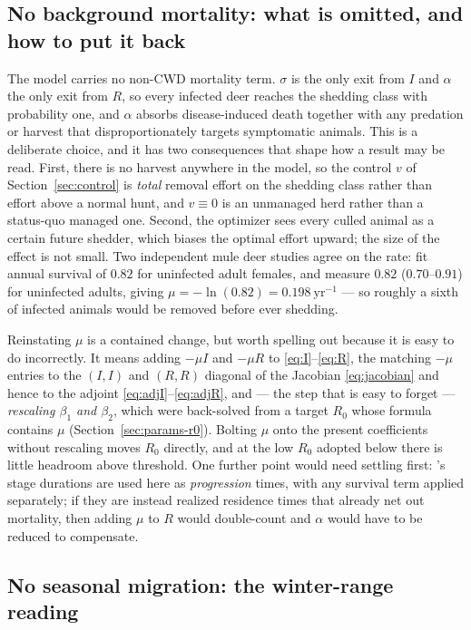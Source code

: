 \documentclass[11pt]{article}
\begin{document}
\subsection{No background mortality: what is omitted, and how to put it back}
\label{sec:params-mortality}

The model carries no non-CWD mortality term. $\sigma$ is the only exit from $I$ and $\alpha$ the only exit from $R$, so every infected deer reaches the shedding class with probability one, and $\alpha$ absorbs disease-induced death together with any predation or harvest that disproportionately targets symptomatic animals. This is a deliberate choice, and it has two consequences that shape how a result may be read. First, there is no harvest anywhere in the model, so the control $v$ of Section~\ref{sec:control} is \emph{total} removal effort on the shedding class rather than effort above a normal hunt, and $v\equiv0$ is an unmanaged herd rather than a status-quo managed one. Second, the optimizer sees every culled animal as a certain future shedder, which biases the optimal effort upward; the size of the effect is not small. Two independent mule deer studies agree on the rate: \citet{Geremia2015} fit annual survival of $0.82$ for uninfected adult females, and \citet{Miller2008} measure $0.82$ ($0.70$--$0.91$) for uninfected adults, giving $\mu = -\ln(0.82) = 0.198\ \mathrm{yr}^{-1}$ --- so roughly a sixth of infected animals would be removed before ever shedding.

Reinstating $\mu$ is a contained change, but worth spelling out because it is easy to do incorrectly. It means adding $-\mu I$ and $-\mu R$ to \eqref{eq:I}--\eqref{eq:R}, the matching $-\mu$ entries to the $(I,I)$ and $(R,R)$ diagonal of the Jacobian \eqref{eq:jacobian} and hence to the adjoint \eqref{eq:adjI}--\eqref{eq:adjR}, and --- the step that is easy to forget --- \emph{rescaling $\beta_1$ and $\beta_2$}, which were back-solved from a target $R_0$ whose formula contains $\mu$ (Section~\ref{sec:params-r0}). Bolting $\mu$ onto the present coefficients without rescaling moves $R_0$ directly, and at the low $R_0$ adopted below there is little headroom above threshold. One further point would need settling first: \citeauthor{Almberg2011}'s stage durations are used here as \emph{progression} times, with any survival term applied separately; if they are instead realized residence times that already net out mortality, then adding $\mu$ to $R$ would double-count and $\alpha$ would have to be reduced to compensate.

\subsection{No seasonal migration: the winter-range reading}
\label{sec:params-migration}
\end{document}
